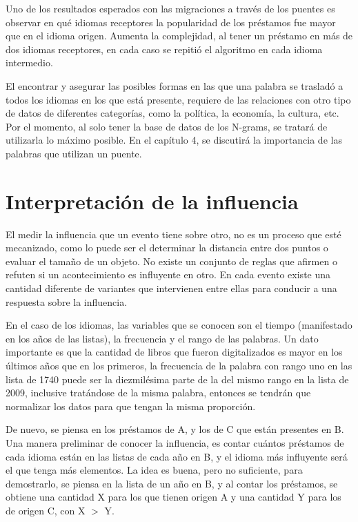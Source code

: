 Uno de los resultados esperados con las migraciones a través de los puentes es observar en qué idiomas receptores la popularidad de los préstamos fue mayor que en el idioma origen. Aumenta la complejidad, al tener un préstamo en más de dos idiomas receptores, en cada caso se repitió el algoritmo en cada idioma intermedio. 

El encontrar y asegurar las posibles formas en las que una palabra se trasladó a todos los idiomas en los que está presente,  requiere de las relaciones con otro tipo de datos de diferentes categorías, como la política, la economía, la cultura, etc. Por el momento, al solo tener la base de datos de los N-grams, se tratará de utilizarla lo máximo posible.  En el capítulo 4, se discutirá la importancia de las palabras que utilizan un puente. 

\newpage
\section{Interpretación de la influencia}

El medir la influencia que un evento tiene sobre otro, no es un proceso que esté mecanizado, como lo puede ser el determinar la distancia entre dos puntos o evaluar el tamaño de un objeto.  No existe un conjunto de reglas que afirmen o refuten si un acontecimiento es influyente en otro. En cada evento existe una cantidad diferente de variantes que intervienen entre ellas para  conducir a una respuesta sobre la influencia. 

En el caso de los idiomas, las variables que se conocen son el tiempo (manifestado en los años de las listas), la frecuencia y el rango de las palabras.  Un dato importante es que la cantidad de libros que fueron digitalizados es mayor en los últimos años que en los primeros,  la frecuencia de la palabra con rango uno en las lista de 1740 puede ser la diezmilésima parte de la del mismo rango en la lista de 2009, inclusive tratándose de la misma palabra,  entonces se tendrán que normalizar los datos para que tengan la misma proporción. 

De nuevo, se piensa en los préstamos de A, y los de C que están presentes en B.  Una manera preliminar de conocer la influencia, es contar cuántos préstamos de cada idioma están en las listas de cada año en B,  y el idioma más influyente será el que tenga más elementos. La idea es buena, pero no suficiente, para demostrarlo, se piensa en la lista de un año en B,  y al contar los préstamos, se obtiene una cantidad X para los que tienen origen A y  una cantidad Y para los de origen C,  con X $>$ Y. 

